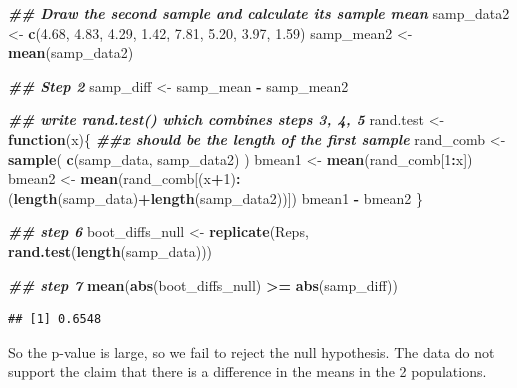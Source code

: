 \documentclass[
]{book}
\newenvironment{Shaded}{\begin{snugshade}}{\end{snugshade}}
\newcommand{\ControlFlowTok}[1]{\textcolor[rgb]{0.13,0.29,0.53}{\textbf{#1}}}
\newcommand{\DecValTok}[1]{\textcolor[rgb]{0.00,0.00,0.81}{#1}}
\newcommand{\DocumentationTok}[1]{\textcolor[rgb]{0.56,0.35,0.01}{\textbf{\textit{#1}}}}
\newcommand{\FloatTok}[1]{\textcolor[rgb]{0.00,0.00,0.81}{#1}}
\newcommand{\FunctionTok}[1]{\textcolor[rgb]{0.13,0.29,0.53}{\textbf{#1}}}
\newcommand{\NormalTok}[1]{#1}
\newcommand{\OtherTok}[1]{\textcolor[rgb]{0.56,0.35,0.01}{#1}}
\newcommand{\SpecialCharTok}[1]{\textcolor[rgb]{0.81,0.36,0.00}{\textbf{#1}}}
\theoremstyle{definition}
\theoremstyle{definition}
\theoremstyle{definition}
\theoremstyle{definition}
\theoremstyle{remark}
\begin{document}
\begin{Shaded}
\begin{Highlighting}[]
\DocumentationTok{\#\# Draw the second sample and calculate its sample mean}
\NormalTok{samp\_data2 }\OtherTok{\textless{}{-}} \FunctionTok{c}\NormalTok{(}\FloatTok{4.68}\NormalTok{, }\FloatTok{4.83}\NormalTok{, }\FloatTok{4.29}\NormalTok{, }\FloatTok{1.42}\NormalTok{, }\FloatTok{7.81}\NormalTok{, }\FloatTok{5.20}\NormalTok{, }\FloatTok{3.97}\NormalTok{, }\FloatTok{1.59}\NormalTok{)}
\NormalTok{samp\_mean2 }\OtherTok{\textless{}{-}} \FunctionTok{mean}\NormalTok{(samp\_data2)}

\DocumentationTok{\#\# Step 2}
\NormalTok{samp\_diff }\OtherTok{\textless{}{-}}\NormalTok{ samp\_mean }\SpecialCharTok{{-}}\NormalTok{ samp\_mean2}

\DocumentationTok{\#\# write rand.test() which combines steps 3, 4, 5}
\NormalTok{rand.test }\OtherTok{\textless{}{-}} \ControlFlowTok{function}\NormalTok{(x)\{ }\DocumentationTok{\#\#x should be the length of the first sample}
\NormalTok{  rand\_comb }\OtherTok{\textless{}{-}} \FunctionTok{sample}\NormalTok{( }\FunctionTok{c}\NormalTok{(samp\_data, samp\_data2) )}
\NormalTok{  bmean1 }\OtherTok{\textless{}{-}} \FunctionTok{mean}\NormalTok{(rand\_comb[}\DecValTok{1}\SpecialCharTok{:}\NormalTok{x])}
\NormalTok{  bmean2 }\OtherTok{\textless{}{-}} \FunctionTok{mean}\NormalTok{(rand\_comb[(x}\SpecialCharTok{+}\DecValTok{1}\NormalTok{)}\SpecialCharTok{:}\NormalTok{(}\FunctionTok{length}\NormalTok{(samp\_data)}\SpecialCharTok{+}\FunctionTok{length}\NormalTok{(samp\_data2))])}
\NormalTok{  bmean1 }\SpecialCharTok{{-}}\NormalTok{ bmean2}
\NormalTok{\}}

\DocumentationTok{\#\# step 6}
\NormalTok{boot\_diffs\_null }\OtherTok{\textless{}{-}} \FunctionTok{replicate}\NormalTok{(Reps, }\FunctionTok{rand.test}\NormalTok{(}\FunctionTok{length}\NormalTok{(samp\_data)))}

\DocumentationTok{\#\# step 7}
\FunctionTok{mean}\NormalTok{(}\FunctionTok{abs}\NormalTok{(boot\_diffs\_null) }\SpecialCharTok{\textgreater{}=} \FunctionTok{abs}\NormalTok{(samp\_diff)) }
\end{Highlighting}
\end{Shaded}

\begin{verbatim}
## [1] 0.6548
\end{verbatim}

So the p-value is large, so we fail to reject the null hypothesis. The data do not support the claim that there is a difference in the means in the 2 populations.
\end{document}
